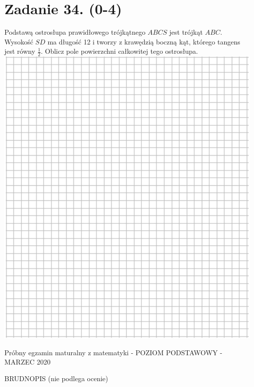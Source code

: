 \documentclass[10pt]{article}
\begin{document}
\section*{Zadanie 34. (0-4)}
Podstawą ostrosłupa prawidłowego trójkątnego \(A B C S\) jest trójkąt \(A B C\). Wysokość \(S D\) ma długość 12 i tworzy z krawędzią boczną kąt, którego tangens jest równy \(\frac{1}{2}\). Oblicz pole powierzchni całkowitej tego ostrosłupa.\\
\includegraphics[max width=\textwidth, center]{2024_11_21_ba65d61981011633d840g-18}

Próbny egzamin maturalny z matematyki - POZIOM PODSTAWOWY - MARZEC 2020

BRUDNOPIS (nie podlega ocenie)
\end{document}

